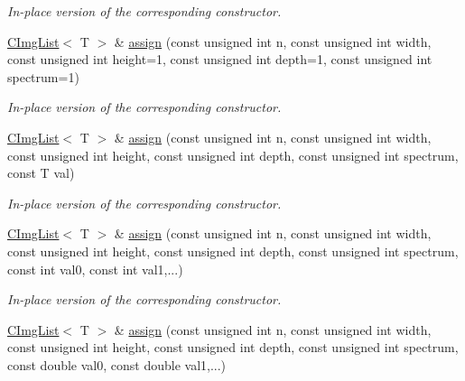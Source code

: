 \begin{DoxyCompactItemize}
\begin{DoxyCompactList}\small\item\em In-\/place version of the corresponding constructor. \item\end{DoxyCompactList}\item 
\hypertarget{structcimg__library_1_1CImgList_a272f3c85f8f6c8f50c9a57b37e2af7e7}{
\hyperlink{structcimg__library_1_1CImgList}{CImgList}$<$ T $>$ \& \hyperlink{structcimg__library_1_1CImgList_a272f3c85f8f6c8f50c9a57b37e2af7e7}{assign} (const unsigned int n, const unsigned int width, const unsigned int height=1, const unsigned int depth=1, const unsigned int spectrum=1)}
\label{structcimg__library_1_1CImgList_a272f3c85f8f6c8f50c9a57b37e2af7e7}

\begin{DoxyCompactList}\small\item\em In-\/place version of the corresponding constructor. \item\end{DoxyCompactList}\item 
\hypertarget{structcimg__library_1_1CImgList_a5c899bf2d49584ecd916d0790bd924f1}{
\hyperlink{structcimg__library_1_1CImgList}{CImgList}$<$ T $>$ \& \hyperlink{structcimg__library_1_1CImgList_a5c899bf2d49584ecd916d0790bd924f1}{assign} (const unsigned int n, const unsigned int width, const unsigned int height, const unsigned int depth, const unsigned int spectrum, const T val)}
\label{structcimg__library_1_1CImgList_a5c899bf2d49584ecd916d0790bd924f1}

\begin{DoxyCompactList}\small\item\em In-\/place version of the corresponding constructor. \item\end{DoxyCompactList}\item 
\hypertarget{structcimg__library_1_1CImgList_abcc4cc51e8aabb81a9d510984016eaba}{
\hyperlink{structcimg__library_1_1CImgList}{CImgList}$<$ T $>$ \& \hyperlink{structcimg__library_1_1CImgList_abcc4cc51e8aabb81a9d510984016eaba}{assign} (const unsigned int n, const unsigned int width, const unsigned int height, const unsigned int depth, const unsigned int spectrum, const int val0, const int val1,...)}
\label{structcimg__library_1_1CImgList_abcc4cc51e8aabb81a9d510984016eaba}

\begin{DoxyCompactList}\small\item\em In-\/place version of the corresponding constructor. \item\end{DoxyCompactList}\item 
\hypertarget{structcimg__library_1_1CImgList_a3df64307b7dce388b7ba945c8d9cdeb1}{
\hyperlink{structcimg__library_1_1CImgList}{CImgList}$<$ T $>$ \& \hyperlink{structcimg__library_1_1CImgList_a3df64307b7dce388b7ba945c8d9cdeb1}{assign} (const unsigned int n, const unsigned int width, const unsigned int height, const unsigned int depth, const unsigned int spectrum, const double val0, const double val1,...)}
\label{structcimg__library_1_1CImgList_a3df64307b7dce388b7ba945c8d9cdeb1}


\end{DoxyCompactItemize}
